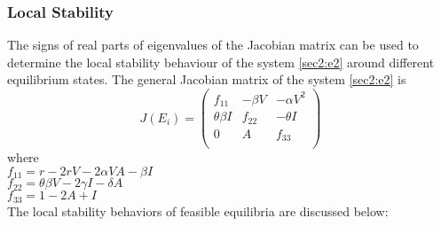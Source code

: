 \documentclass[12pt,a4wide]{report}
\numberwithin{equation}{chapter}
\numberwithin{theorem}{chapter}
\begin{document}
\subsubsection{Local Stability}
 The signs of real parts of eigenvalues of the Jacobian matrix can be used to determine the local stability behaviour of the system \eqref{sec2:e2} around different equilibrium states.
The general Jacobian matrix of the system \eqref{sec2:e2} is
\begin{equation}\label{sec3:e28}
J(E_i)=
\left({\begin{matrix}
	f_{11} & -\beta V & -\alpha V^2\\
	\theta \beta I & f_{22} & -\theta I\\
	0 & A & f_{33}\\
\end{matrix}}\right)
\end{equation}
where\\
$f_{11}=r-2rV-2\alpha V A-\beta I$\\
$f_{22}=\theta \beta V - 2\gamma I - \delta A$\\
$f_{33}=1-2A + I$\\
The local stability behaviors of  feasible equilibria are discussed below:
\end{document}

